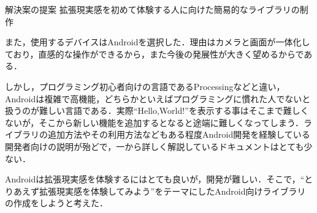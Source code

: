 \vspace{5pt}
\begin{itembox}[l]{解決案の提案}
拡張現実感を初めて体験する人に向けた簡易的なライブラリの制作
\end{itembox}
\par
\vspace{5pt}

また，使用するデバイスはAndroidを選択した．理由はカメラと画面が一体化しており，直感的な操作ができるから，また今後の発展性が大きく望めるからである．
\par \vspace{5pt}
しかし，プログラミング初心者向けの言語であるProcessing\cite{Processing}などと違い，Androidは複雑で高機能，どちらかといえばプログラミングに慣れた人でないと扱うのが難しい言語である．実際``Hello,World!''を表示する事はそこまで難しくないが，そこから新しい機能を追加するとなると途端に難しくなってしまう．ライブラリの追加方法やその利用方法などもある程度Android開発を経験している開発者向けの説明が殆どで，一から詳しく解説しているドキュメントはとても少ない．
\par \vspace{5pt}
Androidは拡張現実感を体験するにはとても良いが，開発が難しい．そこで，``とりあえず拡張現実感を体験してみよう''をテーマにしたAndroid向けライブラリの作成をしようと考えた．